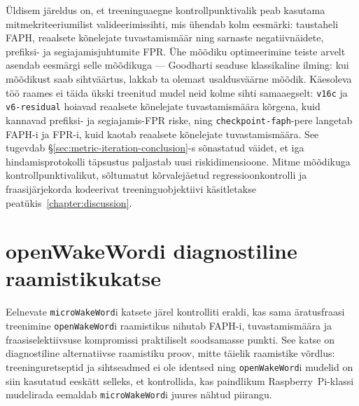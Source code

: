 Üldisem järeldus on, et treeninguaegne kontrollpunktivalik peab kasutama mitmekriteeriumilist valideerimissihti, mis ühendab kolm eesmärki: taustaheli FAPH, reaalsete kõnelejate tuvastamismäär ning sarnaste negatiivnäidete, prefiksi- ja segiajamisjuhtumite FPR. Ühe mõõdiku optimeerimine teiste arvelt asendab eesmärgi selle mõõdikuga --- Goodharti seaduse klassikaline ilming: kui mõõdikust saab sihtväärtus, lakkab ta olemast usaldusväärne mõõdik. Käesoleva töö raames ei täida ükski treenitud mudel neid kolme sihti samaaegselt: \texttt{v16c} ja \texttt{v6-residual} hoiavad reaalsete kõnelejate tuvastamismäära kõrgena, kuid kannavad prefiksi- ja segiajamis-FPR riske, ning \texttt{checkpoint-faph}-pere langetab FAPH-i ja FPR-i, kuid kaotab reaalsete kõnelejate tuvastamismäära. See tugevdab §\ref{sec:metric-iteration-conclusion}-s sõnastatud väidet, et iga hindamisprotokolli täpsustus paljastab uusi riskidimensioone. Mitme mõõdikuga kontrollpunktivalikut, sõltumatut kõrvalejäetud regressioonkontrolli ja fraasijärjekorda kodeerivat treeninguobjektiivi käsitletakse peatükis~\ref{chapter:discussion}.

\section{openWakeWordi diagnostiline raamistikukatse}
\label{sec:openwakeword-diagnostic-results}

Eelnevate \texttt{microWakeWord}i katsete järel kontrolliti eraldi, kas sama äratusfraasi treenimine \texttt{openWakeWord}i raamistikus nihutab FAPH-i, tuvastamismäära ja fraasiselektiivsuse kompromissi praktiliselt soodsamasse punkti. See katse on diagnostiline alternatiivse raamistiku proov, mitte täielik raamistike võrdlus: treeninguretseptid ja sihtseadmed ei ole identsed ning \texttt{openWakeWord}i mudelid on siin kasutatud eeskätt selleks, et kontrollida, kas paindlikum Raspberry~Pi-klassi mudelirada eemaldab \texttt{microWakeWord}i juures nähtud piirangu.

